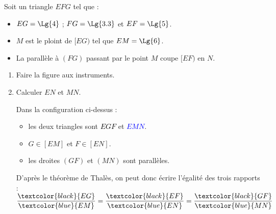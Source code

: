     \phantom{rrr}

    \begin{multicols}{2}
        Soit un triangle $EFG$ tel que :
        \begin{itemize}
            \item $EG=\Lg{4}$ ; $FG=\Lg{3.3}$ et $EF=\Lg{5}$.
            \item $M$ est le ploint de $[EG)$ tel que $EM=\Lg{6}$.
            \item La parallèle à $(FG)$ passant par le point $M$ coupe $[EF)$ en $N$.
        \end{itemize}

        \begin{enumerate}
            \item Faire la figure aux instruments.


        \item Calculer $EN$ et $MN$.

        {\color{red}
        Dans la configuration ci-dessus :
        \begin{itemize}
            \item les deux triangles sont \textcolor{black}{$EGF$} et \textcolor{blue}{$EMN$}.
            \item $G \in [EM]$ et $F \in [EN]$.
            \item les droites $(GF)$ et $(MN)$ sont parallèles.
        \end{itemize}
        \columnbreak
        D'après le théorème de Thalès, on peut donc écrire l'égalité des trois rapports :
        $\dfrac{\textcolor{black}{EG}}{\textcolor{blue}{EM}}=\dfrac{\textcolor{black}{EF}}{\textcolor{blue}{EN}}=\dfrac{\textcolor{black}{GF}}{\textcolor{blue}{MN}}$

}
\end{enumerate}
\end{multicols}
